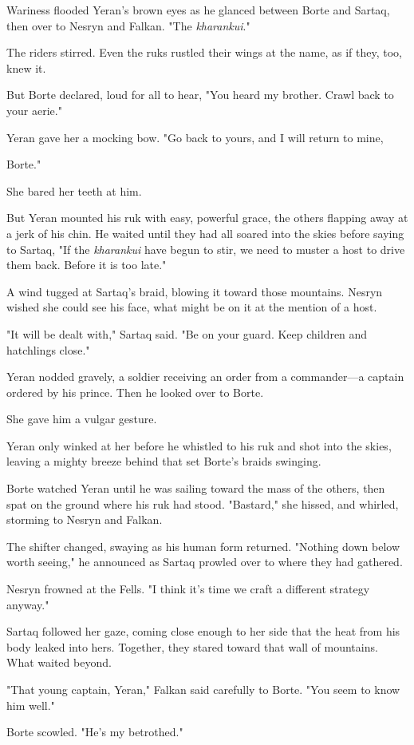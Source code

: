Wariness flooded Yeran's brown eyes as he glanced between Borte and Sartaq, then over to Nesryn and Falkan. "The \emph{kharankui}."

The riders stirred. Even the ruks rustled their wings at the name, as if they, too, knew it.

But Borte declared, loud for all to hear, "You heard my brother. Crawl back to your aerie."

Yeran gave her a mocking bow. "Go back to yours, and I will return to mine,

Borte."

She bared her teeth at him.

But Yeran mounted his ruk with easy, powerful grace, the others flapping away at a jerk of his chin. He waited until they had all soared into the skies before saying to Sartaq, "If the \emph{kharankui} have begun to stir, we need to muster a host to drive them back. Before it is too late."

A wind tugged at Sartaq's braid, blowing it toward those mountains. Nesryn wished she could see his face, what might be on it at the mention of a host.

"It will be dealt with," Sartaq said. "Be on your guard. Keep children and hatchlings close."

Yeran nodded gravely, a soldier receiving an order from a commander---a captain ordered by his prince. Then he looked over to Borte.

She gave him a vulgar gesture.

Yeran only winked at her before he whistled to his ruk and shot into the skies, leaving a mighty breeze behind that set Borte's braids swinging.

Borte watched Yeran until he was sailing toward the mass of the others, then spat on the ground where his ruk had stood. "Bastard," she hissed, and whirled, storming to Nesryn and Falkan.

The shifter changed, swaying as his human form returned. "Nothing down below worth seeing," he announced as Sartaq prowled over to where they had gathered.

Nesryn frowned at the Fells. "I think it's time we craft a different strategy anyway."

Sartaq followed her gaze, coming close enough to her side that the heat from his body leaked into hers. Together, they stared toward that wall of mountains. What waited beyond.

"That young captain, Yeran," Falkan said carefully to Borte. "You seem to know him well."

Borte scowled. "He's my betrothed."


